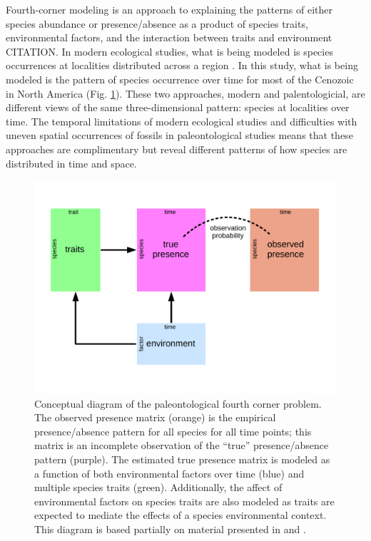 \documentclass[12pt,letterpaper]{article}
\begin{document}
Fourth-corner modeling is an approach to explaining the patterns of either species abundance or presence/absence as a product of species traits, environmental factors, and the interaction between traits and environment \citep{Brown2014c,Warton2015a,Pollock2012,Jamil2013} CITATION. In modern ecological studies, what is being modeled is species occurrences at localities distributed across a region \citep{Pollock2012,Jamil2013}. In this study, what is being modeled is the pattern of species occurrence over time for most of the Cenozoic in North America (Fig. \ref{fig:concept_fourth_corner}). These two approaches, modern and palentologicial, are different views of the same three-dimensional pattern: species at localities over time. The temporal limitations of modern ecological studies and difficulties with uneven spatial occurrences of fossils in paleontological studies means that these approaches are complimentary but reveal different patterns of how species are distributed in time and space.

\begin{figure}[ht]
  \centering
  \includegraphics[width=\textwidth,height=0.8\textheight,keepaspectratio=true]{figure/paleo_fourth_corner}
  \caption[Conceptual diagram of the paleontological fourth-courner problem]{Conceptual diagram of the paleontological fourth corner problem. The observed presence matrix (orange) is the empirical presence/absence pattern for all species for all time points; this matrix is an incomplete observation of the ``true'' presence/absence pattern (purple). The estimated true presence matrix is modeled as a function of both environmental factors over time (blue) and multiple species traits (green). Additionally, the affect of environmental factors on species traits are also modeled as traits are expected to mediate the effects of a species environmental context. This diagram is based partially on material presented in \citet{Brown2014c} and \citet{Warton2015a}.}
  \label{fig:concept_fourth_corner}
\end{figure}
\end{document}
